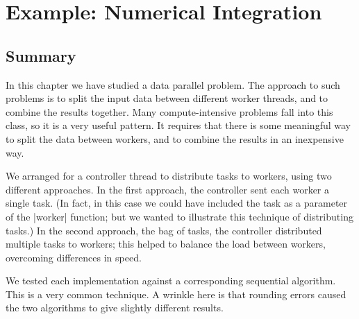 \chapter{Example: Numerical Integration}



\section{Summary}

In this chapter we have studied a data parallel problem.  The approach to such
problems is to split the input data between different worker threads, and to
combine the results together.  Many compute-intensive problems fall into this
class, so it is a very useful pattern.  It  requires that there is some
meaningful way to split the data between workers, and to combine the results
in an inexpensive way.

We arranged for a controller thread to distribute tasks to workers, using two
different approaches.  In the first approach, the controller sent each worker
a single task.  (In fact, in this case we could have included the task as a
parameter of the |worker| function; but we wanted to illustrate this technique
of distributing tasks.)  In the second approach, the bag of tasks, the
controller distributed multiple tasks to workers; this helped to balance the
load between workers, overcoming differences in speed.

We tested each implementation against a corresponding sequential algorithm.
This is a very common technique.  A wrinkle here is that rounding errors
caused the two algorithms to give slightly different results.  



